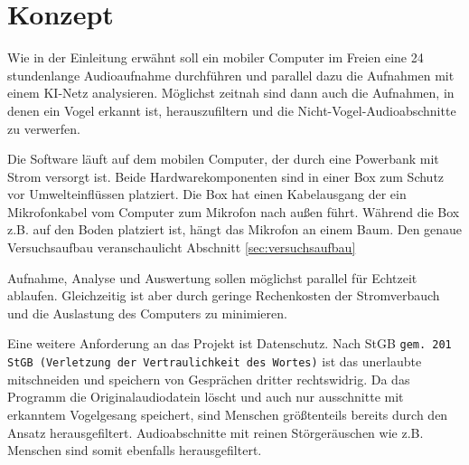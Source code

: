 \section{Konzept}
\label{sec:Konzept}

Wie in der Einleitung erwähnt soll ein mobiler Computer im Freien eine 24 stundenlange Audioaufnahme durchführen und parallel dazu die Aufnahmen mit einem KI-Netz analysieren. Möglichst zeitnah sind dann auch die Aufnahmen, in denen ein Vogel erkannt ist, herauszufiltern und die Nicht-Vogel-Audioabschnitte zu verwerfen. 

Die Software läuft auf dem mobilen Computer, der durch eine Powerbank mit Strom versorgt ist. Beide Hardwarekomponenten sind in einer Box zum Schutz vor Umwelteinflüssen platziert. Die Box hat einen Kabelausgang der ein Mikrofonkabel vom Computer zum Mikrofon nach außen führt. Während die Box z.B. auf den Boden platziert ist, hängt das Mikrofon an einem Baum. 
Den genaue Versuchsaufbau veranschaulicht Abschnitt \ref{sec:versuchsaufbau}


Aufnahme, Analyse und Auswertung sollen möglichst parallel für Echtzeit ablaufen. Gleichzeitig ist aber durch geringe Rechenkosten der Stromverbauch und die Auslastung des Computers zu minimieren.


Eine weitere Anforderung an das Projekt ist Datenschutz. Nach StGB \texttt{gem. 201 StGB (Verletzung der Vertraulichkeit des Wortes)}  ist das unerlaubte mitschneiden und speichern von Gesprächen dritter rechtswidrig. Da das Programm die Originalaudiodatein löscht und auch nur ausschnitte mit erkanntem Vogelgesang speichert, sind Menschen größtenteils bereits durch den Ansatz herausgefiltert. Audioabschnitte mit reinen Störgeräuschen wie z.B. Menschen sind somit ebenfalls herausgefiltert.